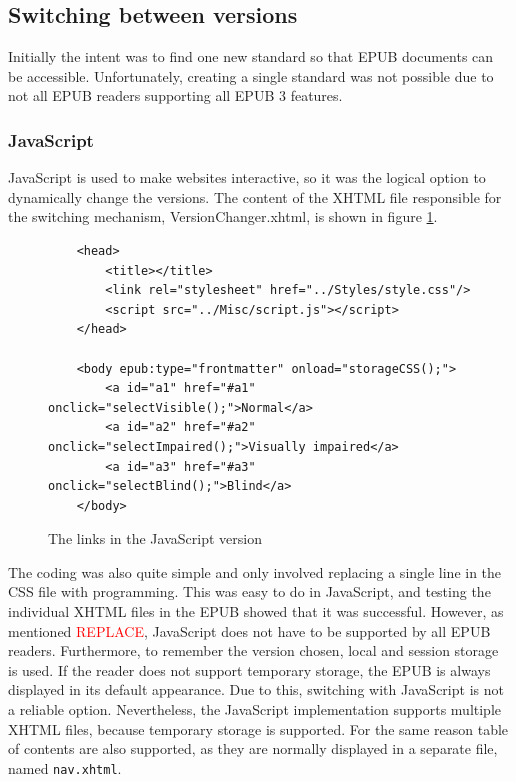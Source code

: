\subsection{Switching between versions}

Initially the intent was to find one new standard so that EPUB documents can be accessible. Unfortunately, creating a single standard was not possible due to not all EPUB readers supporting all EPUB 3 features.

\subsubsection{JavaScript}
JavaScript is used to make websites interactive, so it was the logical option to dynamically change the versions. The content of the XHTML file responsible for the switching mechanism, VersionChanger.xhtml, is shown in figure \ref{fig:js_switch}. 

\begin{figure}
	
	\begin{lstlisting}
	<head>
		<title></title>
		<link rel="stylesheet" href="../Styles/style.css"/>
		<script src="../Misc/script.js"></script>
	</head>
	
	<body epub:type="frontmatter" onload="storageCSS();">
		<a id="a1" href="#a1" onclick="selectVisible();">Normal</a>
		<a id="a2" href="#a2" onclick="selectImpaired();">Visually impaired</a>
		<a id="a3" href="#a3" onclick="selectBlind();">Blind</a>
	</body>
	\end{lstlisting}
	\caption{The links in the JavaScript version}
	\label{fig:js_switch}
\end{figure}

The coding was also quite simple and only involved replacing a single line in the CSS file with programming. This was easy to do in JavaScript, and testing the individual XHTML files in the EPUB showed that it was successful. However, as mentioned \textcolor{red}{REPLACE}, JavaScript does not have to be supported by all EPUB readers. Furthermore, to remember the version chosen, local and session storage is used. If the reader does not support temporary storage, the EPUB is always displayed in its default appearance. Due to this, switching with JavaScript is not a reliable option. Nevertheless, the JavaScript implementation supports multiple XHTML files, because temporary storage is supported. For the same reason table of contents are also supported, as they are normally displayed in a separate file, named \lstinline|nav.xhtml|. 

